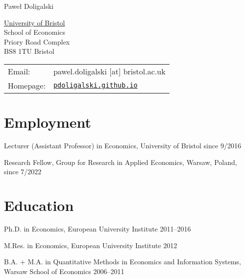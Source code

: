 \documentclass[letterpaper]{article}
\def\name{Pawe\l{} Doligalski}
\renewenvironment{itemize}{
  \begin{list}{}{
    \setlength{\leftmargin}{1.5em}
  }
}{
  \end{list}
}
\begin{document}
{\huge \name}


\vspace{0.25in}

\begin{minipage}{0.45\linewidth}
  \href{http://www.unc.edu/}{University of Bristol} \\
  School of Economics \\
  Priory Road Complex \\
  BS8 1TU Bristol
\end{minipage}
\begin{minipage}{0.45\linewidth}
  \begin{tabular}{ll}
    Email: & pawel.doligalski [at] bristol.ac.uk \\
    Homepage: & \href{http://pdoligalski.github.io}{\tt pdoligalski.github.io} \\
  \end{tabular}
\end{minipage}

\section*{Employment}

\begin{itemize}
\item Lecturer (Assistant Professor) in Economics, University of Bristol \hfill since 9/2016

\item Research Fellow, Group for Research in Applied Economics, Warsaw, Poland, \hfill since 7/2022

\end{itemize}


\section*{Education}

\begin{itemize}
  \item Ph.D. in Economics, European University Institute \hfill 2011--2016

  \item M.Res. in Economics, European University Institute \hfill 2012

  \item{B.A. + M.A. in Quantitative Methods in Economics and Information Systems,\\
   \indent \hspace{8cm} Warsaw School of Economics \hfill 2006--2011}


\end{itemize}
\end{document}
